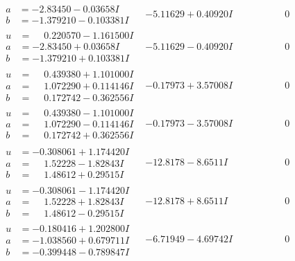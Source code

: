 \documentclass[1p]{elsarticle_modified}
\theoremstyle{definition}
\begin{document}
$$\begin{array}{c|c|c}
\begin{aligned}
a &= -2.83450 - 0.03658 I \\
b &= -1.379210 - 0.103381 I\end{aligned}
 & -5.11629 + 0.40920 I & \phantom{-0.000000 } 0 \\ \hline\begin{aligned}
u &= \phantom{-}0.220570 - 1.161500 I \\
a &= -2.83450 + 0.03658 I \\
b &= -1.379210 + 0.103381 I\end{aligned}
 & -5.11629 - 0.40920 I & \phantom{-0.000000 } 0 \\ \hline\begin{aligned}
u &= \phantom{-}0.439380 + 1.101000 I \\
a &= \phantom{-}1.072290 + 0.114146 I \\
b &= \phantom{-}0.172742 - 0.362556 I\end{aligned}
 & -0.17973 + 3.57008 I & \phantom{-0.000000 } 0 \\ \hline\begin{aligned}
u &= \phantom{-}0.439380 - 1.101000 I \\
a &= \phantom{-}1.072290 - 0.114146 I \\
b &= \phantom{-}0.172742 + 0.362556 I\end{aligned}
 & -0.17973 - 3.57008 I & \phantom{-0.000000 } 0 \\ \hline\begin{aligned}
u &= -0.308061 + 1.174420 I \\
a &= \phantom{-}1.52228 - 1.82843 I \\
b &= \phantom{-}1.48612 + 0.29515 I\end{aligned}
 & -12.8178 - 8.6511 I & \phantom{-0.000000 } 0 \\ \hline\begin{aligned}
u &= -0.308061 - 1.174420 I \\
a &= \phantom{-}1.52228 + 1.82843 I \\
b &= \phantom{-}1.48612 - 0.29515 I\end{aligned}
 & -12.8178 + 8.6511 I & \phantom{-0.000000 } 0 \\ \hline\begin{aligned}
u &= -0.180416 + 1.202800 I \\
a &= -1.038560 + 0.679711 I \\
b &= -0.399448 - 0.789847 I\end{aligned}
 & -6.71949 - 4.69742 I & \phantom{-0.000000 } 0 \\ \hline\begin{aligned}

\end{aligned}
\end{array}$$
\end{document}
